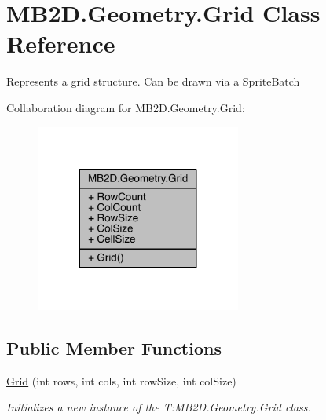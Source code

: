 \hypertarget{class_m_b2_d_1_1_geometry_1_1_grid}{}\section{M\+B2\+D.\+Geometry.\+Grid Class Reference}
\label{class_m_b2_d_1_1_geometry_1_1_grid}


Represents a grid structure. Can be drawn via a Sprite\+Batch  




Collaboration diagram for M\+B2\+D.\+Geometry.\+Grid\+:\nopagebreak
\begin{figure}[H]
\begin{center}
\leavevmode
\includegraphics[width=191pt]{class_m_b2_d_1_1_geometry_1_1_grid__coll__graph}
\end{center}
\end{figure}
\subsection*{Public Member Functions}
\begin{DoxyCompactItemize}
\item 
\hyperlink{class_m_b2_d_1_1_geometry_1_1_grid_a7ff870c0156e2fb0fc5fffe081db4a10}{Grid} (int rows, int cols, int row\+Size, int col\+Size)
\begin{DoxyCompactList}\small\item\em Initializes a new instance of the T\+:\+M\+B2\+D.\+Geometry.\+Grid class. \end{DoxyCompactList}\end{DoxyCompactItemize}

